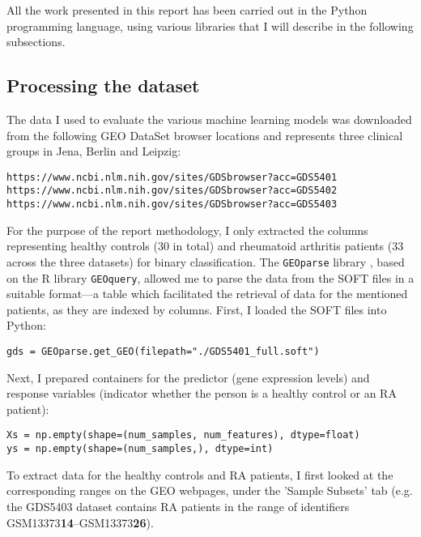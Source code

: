 \documentclass[11pt]{article}
\numberwithin{equation}{section}
\begin{document}
All the work presented in this report has been carried out in the Python programming language, using various libraries that I will describe in the following subsections.

\subsection{Processing the dataset}

The data I used to evaluate the various machine learning models was downloaded from the following GEO DataSet browser locations and represents three clinical groups in Jena, Berlin and Leipzig:

\begin{verbatim}
https://www.ncbi.nlm.nih.gov/sites/GDSbrowser?acc=GDS5401
https://www.ncbi.nlm.nih.gov/sites/GDSbrowser?acc=GDS5402
https://www.ncbi.nlm.nih.gov/sites/GDSbrowser?acc=GDS5403
\end{verbatim}

For the purpose of the report methodology, I only extracted the columns representing healthy controls (30 in total) and rheumatoid arthritis patients (33 across the three datasets) for binary classification. The \texttt{GEOparse} library \cite{geoparse}, based on the R library \texttt{GEOquery}, allowed me to parse the data from the SOFT files in a suitable format---a table which facilitated the retrieval of data for the mentioned patients, as they are indexed by columns. First, I loaded the SOFT files into Python:
\begin{verbatim}
gds = GEOparse.get_GEO(filepath="./GDS5401_full.soft")
\end{verbatim}
Next, I prepared containers for the predictor (gene expression levels) and response variables (indicator whether the person is a healthy control or an RA patient):
\begin{verbatim}
Xs = np.empty(shape=(num_samples, num_features), dtype=float)
ys = np.empty(shape=(num_samples,), dtype=int)
\end{verbatim}
To extract data for the healthy controls and RA patients, I first looked at the corresponding ranges on the GEO webpages,  under the 'Sample Subsets' tab (e.g. the GDS5403 dataset contains RA patients in the range of identifiers GSM13373\textbf{14}--GSM13373\textbf{26}).
\end{document}
